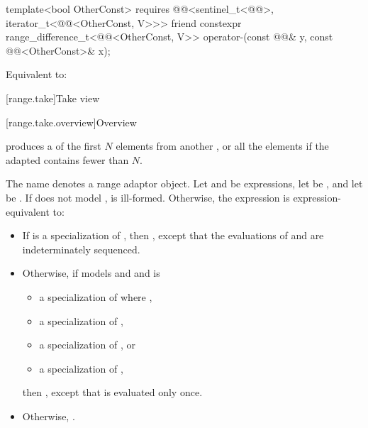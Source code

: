 %
\begin{itemdecl}
template<bool OtherConst>
  requires @@<sentinel_t<@@>, iterator_t<@@<OtherConst, V>>>
friend constexpr range_difference_t<@@<OtherConst, V>>
  operator-(const @@& y, const @@<OtherConst>& x);
\end{itemdecl}

\begin{itemdescr}
\pnum
\effects
Equivalent to: 
\end{itemdescr}

[range.take]{Take view}

[range.take.overview]{Overview}

\pnum
{} produces a  of the first $N$ elements
from another , or all the elements if the adapted
 contains fewer than $N$.

\pnum
{}%
The name  denotes a
range adaptor object.
Let  and  be expressions,
let  be , and
let  be .
If  does not model
,
 is ill-formed.
Otherwise, the expression 
is expression-equivalent to:
\begin{itemize}
\item
If  is a specialization
of ,
then ,
except that the evaluations of  and 
are indeterminately sequenced.

\item
Otherwise, if  models
 and 
and is
\begin{itemize}
\item a specialization of  where ,
\item a specialization of ,
\item a specialization of , or
\item a specialization of ,
\end{itemize}
then ,
except that  is evaluated only once.

\item
Otherwise, .
\end{itemize}


